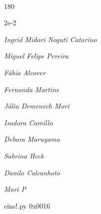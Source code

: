\documentclass[12pt]{article}
\begin{document}
	\hfill	  	  


\pagebreak			

	\ 
	\vfill
	\begin{turn}{180}	
		\begin{minipage}{\textwidth}
		  	\ttfamily %
			\centering
			{\Huge 2e-2}
		  
			\hfill
		  
			

\textit{\small Ingrid Midori Noguti Catarino}

\textit{\small Miguel Felipe Pereira}

\textit{\small Fábio Alcover}

\textit{\small Fernanda Martins}

\textit{\small Júlia Demenech Mori}

\textit{\small Isadora Camillo}

\textit{\small Debora Maruyama}

\textit{\small Sabrina Heck}

\textit{\small Danilo Calcanhoto}

\textit{\small Mari P}

\bigskip

eins!.py
0x0016


		\end{minipage}	
	\end{turn}
	\vfill
	\

\pagebreak
\end{document}
